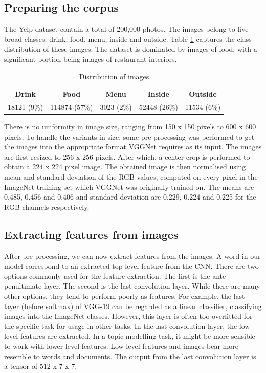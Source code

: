 \documentclass{article}
\begin{document}
\subsection{Preparing the corpus}
The Yelp dataset contain a total of 200,000 photos. The images belong to five broad classes: drink, food, menu, inside and outside. Table \ref{tab:images} captures the class distribution of these images. The dataset is dominated by images of food, with a significant portion being images of restaurant interiors. 

\begin{table}[h]
  \caption{Distribution of images}
  \label{tab:images}
  \centering
    \begin{tabular}{|c|c|c|c|c|}
    \hline
 Drink & Food & Menu & Inside & Outside \\ \hline
 18121 (9\%) & 114874 (57\%) & 3023 (2\%) & 52448 (26\%) & 11534 (6\%)  \\
 \hline
    \end{tabular}
\end{table}

There is no uniformity in image size, ranging from 150 x 150 pixels to 600 x 600 pixels. To handle the variants in size, some pre-processing was performed to get the images into the appropriate format VGGNet requires as its input. The images are first resized to 256 x 256 pixels. After which, a center crop is performed to obtain a 224 x 224 pixel image. The obtained image is then normalised using mean and standard deviation of the RGB values, computed on every pixel in the ImageNet training set which VGGNet was originally trained on. The means are 0.485, 0.456 and 0.406 and standard deviation are 0.229, 0.224 and 0.225 for the RGB channels respectively. 

\subsection{Extracting features from images}\label{extract}
After pre-processing, we can now extract features from the images. A word in our model correspond to an extracted top-level feature from the CNN. There are two options commonly used for the feature extraction. The first is the ante-penultimate layer. The second is the last convolution layer. While there are many other options, they tend to perform poorly as features. For example, the last layer (before softmax) of VGG-19 can be regarded as a linear classifier, classifying images into the ImageNet classes. However, this layer is often too overfitted for the specific task for usage in other tasks. In the last convolution layer, the low-level features are extracted. In a topic modelling task, it might be more sensible to work with lower-level features. Low-level features and images bear more resemble to words and documents. The output from the last convolution layer is a tensor of 512 x 7 x 7. 
\end{document}
